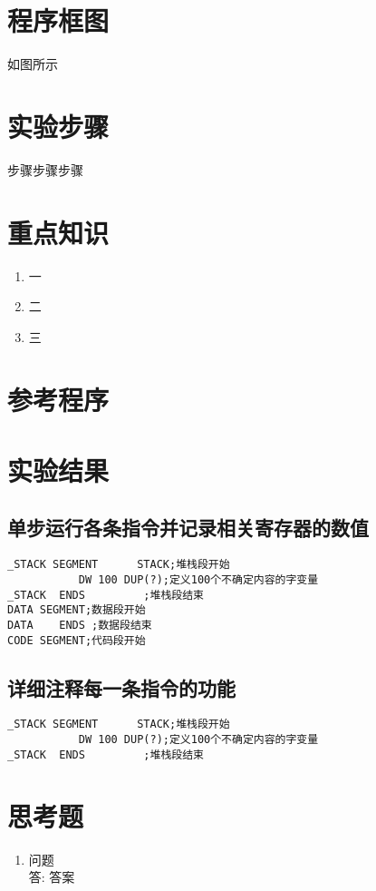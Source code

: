 \documentclass[onecolumn,a4paper]{article}
\begin{document}
\section{程序框图}
如图所示


\section{实验步骤}
步骤步骤步骤

\section{重点知识}
\begin{enumerate}
    \item 一
    \item 二
    \item 三
\end{enumerate}

\section{参考程序}

\section{实验结果}
\subsection{单步运行各条指令并记录相关寄存器的数值}
\begin{lstlisting}
_STACK SEGMENT  	STACK;堆栈段开始
	       DW 100 DUP(?);定义100个不确定内容的字变量
_STACK 	ENDS 	 	 ;堆栈段结束
DATA SEGMENT;数据段开始
DATA 	ENDS ;数据段结束
CODE SEGMENT;代码段开始
\end{lstlisting}
\subsection{详细注释每一条指令的功能}
\begin{lstlisting}
_STACK SEGMENT  	STACK;堆栈段开始
	       DW 100 DUP(?);定义100个不确定内容的字变量
_STACK 	ENDS 	 	 ;堆栈段结束
\end{lstlisting}

\section{思考题}
\begin{enumerate}
\item 问题\\
答: 答案
\end{enumerate}
\end{document}
